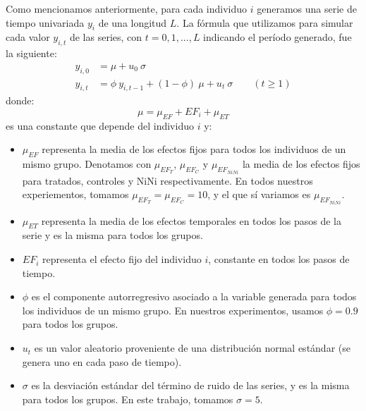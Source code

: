 \documentclass[../../main.tex]{subfiles}
\begin{document}
Como mencionamos anteriormente, para cada individuo \(i\) generamos una serie de tiempo
univariada \(y_i\) de una longitud \(L\). La fórmula que utilizamos para simular cada
valor \(y_{i,t}\) de las series, con \(t = 0, 1, ..., L\) indicando el período generado,
fue la siguiente:
\begin{align}
    y_{i,0} &= \mu + u_0  \ \sigma \\
    y_{i,t} &= \phi \ y_{i,t-1} + (1 - \phi) \ \mu +  u_t \ \sigma \qquad (t \ge 1)
\end{align}
donde:
\[
    \mu = \mu_{EF} + EF_i + \mu_{ET}
\]
es una constante que depende del individuo \(i\) y:
\begin{itemize}[itemsep=0.1cm]
    \item \(\mu_{EF}\) representa la media de los efectos fijos para todos los individuos
    de un mismo grupo. Denotamos con \(\mu_{{EF}_T}\), \(\mu_{{EF}_C}\) y
    \(\mu_{{EF}_{NiNi}}\) la media de los efectos fijos para tratados, controles y NiNi
    respectivamente. En todos nuestros experiementos, tomamos \(\mu_{{EF}_T} =
    \mu_{{EF}_C} = 10\), y el que sí variamos es \(\mu_{{EF}_{NiNi}}\).
    \item \(\mu_{ET}\) representa la media de los efectos temporales en todos los pasos
    de la serie y es la misma para todos los grupos.
    \item \(EF_i\) representa el efecto fijo del individuo \(i\), constante en todos
    los pasos de tiempo.
    \item \(\phi\) es el componente autorregresivo asociado a la variable generada para
    todos los individuos de un mismo grupo. En nuestros experimentos, usamos \(\phi = 0.9\)
    para todos los grupos.
    \item \(u_t\) es un valor aleatorio proveniente de una distribución normal estándar
    (se genera uno en cada paso de tiempo).
    \item \(\sigma\) es la desviación estándar del término de ruido de las series,
    y es la misma para todos los grupos. En este trabajo, tomamos \(\sigma=5\).
\end{itemize}
\end{document}
